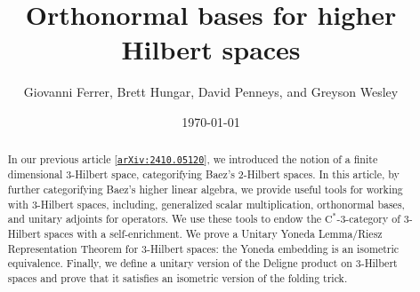 \documentclass[12pt, reqno]{amsart}
\title{Orthonormal bases for higher Hilbert spaces}
\author{Giovanni Ferrer, Brett Hungar, David Penneys, and Greyson Wesley}
\date{\today}
\newcommand{\arxiv}[1]{\href{http://arxiv.org/abs/#1}{\tt arXiv:\nolinkurl{#1}}}
\newcommand{\greyson}[1]{\textcolor{cyan!90!black!100}{[[Greyson: #1]]}}
\theoremstyle{plain}
\theoremstyle{definition}
\newcommand{\dtimesaux}[4]{\mathbin{\vcenter{\hbox{\raisebox{#4}{\scalebox{#3}{\ooalign{\hfil$\vcenter{\hbox{$#1\times$}}$\hfil\cr\hfil$\vcenter{\hbox{\mbox{#2\upshape\wasylozenge}}}$\hfil\cr}}}}}}}
\newcommand{\dtimes}{%
  \mathchoice
    {\dtimesaux{\displaystyle}{\normalsize}{1.15}{0.35ex}}
    {\dtimesaux{\textstyle}{\normalsize}{1.15}{0.35ex}}
    {\dtimesaux{\scriptstyle}{\scriptsize}{1.0}{0ex}}
    {\dtimesaux{\scriptscriptstyle}{\tiny}{1.0}{0ex}}%
}
\newcommand{\threehilbtimes}{\dtimes}
\begin{document}
\begin{abstract}
In our previous article [\arxiv{2410.05120}], we introduced the notion of a finite dimensional 3-Hilbert space, categorifying Baez's 2-Hilbert spaces.
In this article, by further categorifying Baez's higher linear algebra, we provide useful tools for working with 3-Hilbert spaces, including, generalized scalar multiplication, orthonormal bases, and unitary adjoints for operators.
We use these tools to endow the $\mathrm{C}^*$-3-category of 3-Hilbert spaces with a self-enrichment.
We prove a Unitary Yoneda Lemma/Riesz Representation Theorem for 3-Hilbert spaces: the Yoneda embedding is an isometric equivalence.
Finally, we define a unitary version of the Deligne product %
on 3-Hilbert spaces and prove that it satisfies an isometric version of the folding trick.
\end{abstract}

\maketitle

\tableofcontents


\newpage
\end{document}
